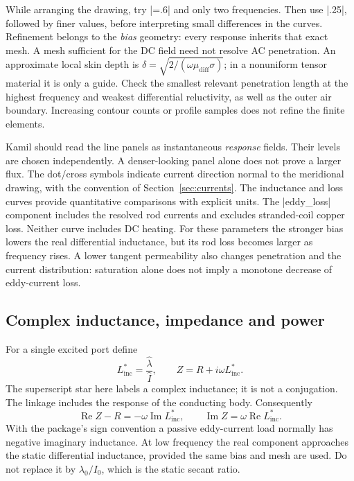 While arranging the drawing, try |\CoreMesh=.6| and only two frequencies.
Then use |.25|, followed by finer values, before interpreting small differences
in the curves. Refinement belongs to the \emph{bias} geometry: every response
inherits that exact mesh. A mesh sufficient for the DC field need not resolve
AC penetration. An approximate local skin depth is
$\delta=\sqrt{2/(\omega\mu_{\mathrm{diff}}\sigma)}$; in a nonuniform tensor
material it is only a guide. Check the smallest relevant penetration length
at the highest frequency and weakest differential reluctivity, as well as the
outer air boundary. Increasing contour counts or profile samples does not
refine the finite elements.


Kamil should read the line panels as instantaneous \emph{response} fields.
Their levels are chosen independently. A denser-looking panel alone does not
prove a larger flux. The dot/cross symbols indicate current direction normal
to the meridional drawing, with the convention of Section~\ref{sec:currents}.
The inductance and loss curves provide quantitative comparisons with explicit
units. The |eddy_loss| component includes the resolved rod currents and excludes
stranded-coil copper loss. Neither curve includes DC heating.
For these parameters the stronger bias lowers the real differential inductance,
but its rod loss becomes larger as frequency rises. A lower tangent permeability
also changes penetration and the current distribution: saturation alone does
not imply a monotone decrease of eddy-current loss.

\subsection{Complex inductance, impedance and power}
For a single excited port define
\[
 L_{\mathrm{inc}}^*=\frac{\widehat\lambda}{\widehat I},\qquad
 Z=R+i\omega L_{\mathrm{inc}}^*.
\]
The superscript star here labels a complex inductance; it is not a conjugation.
The linkage includes the response of the conducting body. Consequently
\[
 \operatorname{Re}Z-R=-\omega\operatorname{Im}L_{\mathrm{inc}}^*,
 \qquad \operatorname{Im}Z=\omega\operatorname{Re}L_{\mathrm{inc}}^*.
\]
With the package's sign convention a passive eddy-current load normally has
negative imaginary inductance. At low frequency the real component approaches
the static differential inductance, provided the same bias and mesh are used.
Do not replace it by $\lambda_0/I_0$, which is the static secant ratio.

